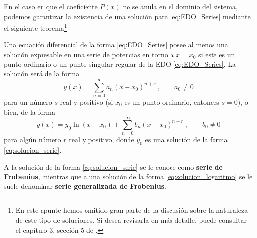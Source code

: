 En el caso en que el coeficiente $P(x)$ no se anula en el dominio del sistema, podemos garantizar la existencia de una solución para \eqref{eq:EDO_Series} mediante el siguiente teorema\footnote{En este apunte hemos omitido gran parte de la discusión sobre la naturaleza de este tipo de soluciones. Si desea revisarla en más detalle, puede consultar el capítulo 3, sección 5 de \cite{Butkov}.}
\begin{teorema}[de Fuchs]\label{teo:Fuchs}
    Una ecuación diferencial de la forma \eqref{eq:EDO_Series} posee al menos una solución expresable en una serie de potencias en torno a $x=x_0$ si este es un punto ordinario o un punto singular regular de la EDO \eqref{eq:EDO_Series}. La solución será de la forma 
    \begin{equation} \label{eq:solucion_serie}
        y(x) = \sum_{n=0}^\infty a_n(x-x_0)^{n+s} \ , \qquad a_0 \neq 0
    \end{equation}
    para un número $s$ real y positivo (si $x_0$ es un punto ordinario, entonces $s=0$), o bien, de la forma 
    \begin{equation}\label{eq:solucion_logaritmo}
        y(x) = y_0 \ln(x-x_0) + \sum_{n=0}^\infty b_n (x-x_0)^{n+r} \ , \qquad b_0 \neq 0 
    \end{equation}
    para algún número $r$ real y positivo, donde $y_0$ es una solución de la forma \eqref{eq:solucion_serie}.

    A la solución de la forma \eqref{eq:solucion_serie} se le conoce como \textbf{serie de Frobenius}, mientras que a una solución de la forma \eqref{eq:solucion_logaritmo} se le suele denominar \textbf{serie generalizada de Frobenius}.
\end{teorema}

